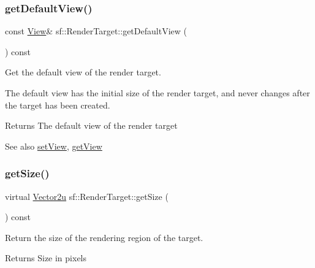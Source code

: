 \subsubsection{\texorpdfstring{getDefaultView()}{getDefaultView()}}
{\footnotesize\ttfamily const \mbox{\hyperlink{classsf_1_1_view}{View}}\& sf\+::\+Render\+Target\+::get\+Default\+View (\begin{DoxyParamCaption}{ }\end{DoxyParamCaption}) const}



Get the default view of the render target. 

The default view has the initial size of the render target, and never changes after the target has been created.

\begin{DoxyReturn}{Returns}
The default view of the render target
\end{DoxyReturn}
\begin{DoxySeeAlso}{See also}
\mbox{\hyperlink{classsf_1_1_render_target_a063db6dd0a14913504af30e50cb6d946}{set\+View}}, \mbox{\hyperlink{classsf_1_1_render_target_a2c179503b4dcdf5282ef6426d317602c}{get\+View}} \begin{DoxyVerb}\end{DoxyVerb}
 
\end{DoxySeeAlso}
\mbox{\label{classsf_1_1_render_target_a2e5ade2457d9fb4c4907ae5b3d9e94a5}} 
\subsubsection{\texorpdfstring{getSize()}{getSize()}}
{\footnotesize\ttfamily virtual \mbox{\hyperlink{classsf_1_1_vector2}{Vector2u}} sf\+::\+Render\+Target\+::get\+Size (\begin{DoxyParamCaption}{ }\end{DoxyParamCaption}) const\hspace{0.3cm}{\ttfamily [pure virtual]}}



Return the size of the rendering region of the target. 

\begin{DoxyReturn}{Returns}
Size in pixels \begin{DoxyVerb}\end{DoxyVerb}
 
\end{DoxyReturn}


